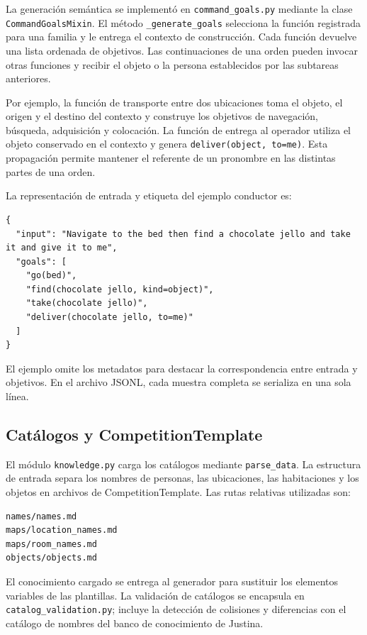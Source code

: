 La generación semántica se implementó en \texttt{command\_\allowbreak goals.\allowbreak py}
mediante la clase \texttt{Command\allowbreak Goals\allowbreak Mixin}. El método
\texttt{\_\allowbreak generate\_\allowbreak goals} selecciona la función registrada para una
familia y le entrega el contexto de construcción. Cada función devuelve
una lista ordenada de objetivos. Las continuaciones de una orden pueden
invocar otras funciones y recibir el objeto o la persona establecidos
por las subtareas anteriores.

Por ejemplo, la función de transporte entre dos ubicaciones toma el
objeto, el origen y el destino del contexto y construye los objetivos
de navegación, búsqueda, adquisición y colocación. La función de entrega
al operador utiliza el objeto conservado en el contexto y genera
\texttt{deliver(object, to=me)}. Esta propagación permite mantener el
referente de un pronombre en las distintas partes de una orden.

La representación de entrada y etiqueta del ejemplo conductor es:

{\scriptsize
\begin{verbatim}
{
  "input": "Navigate to the bed then find a chocolate jello and take it and give it to me",
  "goals": [
    "go(bed)",
    "find(chocolate jello, kind=object)",
    "take(chocolate jello)",
    "deliver(chocolate jello, to=me)"
  ]
}
\end{verbatim}
}

El ejemplo omite los metadatos para destacar la correspondencia entre
entrada y objetivos. En el archivo JSONL, cada muestra completa se
serializa en una sola línea.

\subsection{Catálogos y CompetitionTemplate}

El módulo \texttt{knowledge.py} carga los catálogos mediante
\texttt{parse\_data}. La estructura de entrada separa los nombres de
personas, las ubicaciones, las habitaciones y los objetos en archivos de
CompetitionTemplate. Las rutas relativas utilizadas son:

\begin{verbatim}
names/names.md
maps/location_names.md
maps/room_names.md
objects/objects.md
\end{verbatim}

El conocimiento cargado se entrega al generador para sustituir los
elementos variables de las plantillas. La validación de catálogos se
encapsula en \texttt{catalog\_\allowbreak validation.\allowbreak py}; incluye la detección de
colisiones y diferencias con el catálogo de nombres del banco de
conocimiento de Justina.

